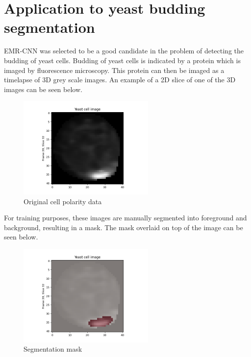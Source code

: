 \documentclass[a4]{article}
\begin{document}
\section{Application to yeast budding segmentation}
EMR-CNN was selected to be a good candidate in the problem of detecting the budding of yeast cells. Budding of yeast cells is indicated by a protein which is imaged by fluorescence microscopy. This protein can then be imaged as a timelapse of 3D grey scale images. An example of a 2D slice of one of the 3D images can be seen below.
\begin{figure}[h!]
    \centering
    \includegraphics[width=0.6\textwidth]{figures/data.png}
    \caption{Original cell polarity data}
    \label{fig:enter-label}
\end{figure}

For training purposes, these images are manually segmented into foreground and background, resulting in a mask. The mask overlaid on top of the image can be seen below.

\begin{figure}[h!]
    \centering
    \includegraphics[width=0.6\textwidth]{figures/mask.png}
    \caption{Segmentation mask}
    \label{fig:enter-label}
\end{figure}
\end{document}
